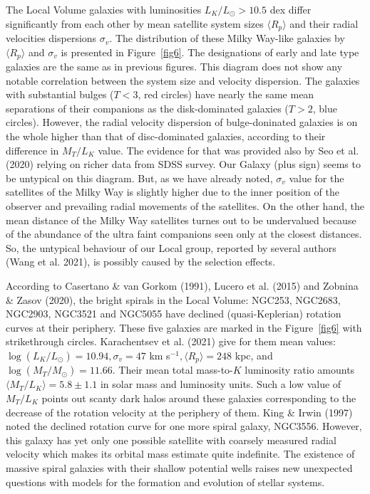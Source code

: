 \documentclass[proof]{WileyASNA-v1}
\begin{document}
The Local Volume galaxies with luminosities $L_K/L_{\odot}>10.5$ dex differ
significantly from each other by mean satellite system sizes $\langle R_p
\rangle$ and their radial velocities dispersions $\sigma_v$. The distribution of
these Milky Way-like galaxies by $\langle R_p\rangle$ and $\sigma_v$ is
presented in Figure~\ref{fig6}. The designations of early and late type galaxies
are the same as in previous figures. This diagram does not show any notable
correlation between the system size and velocity dispersion. The galaxies with
substantial bulges ($T<3$, red circles) have nearly the same mean separations of
their companions as the disk-dominated galaxies ($T>2$, blue circles). However,
the radial velocity dispersion of bulge-doninated galaxies is on the whole
higher than that of disc-dominated galaxies, according to their difference in
$M_T/L_K$ value. The evidence for that was provided also by Seo et al. (2020)
relying on richer data from  SDSS survey. Our Galaxy (plus sign) seems to be
untypical on this diagram. But, as we have already noted, $\sigma_v$ value for
the satellites of the Milky Way is slightly higher due to the inner position of
the observer and prevailing radial movements of the satellites. On the other
hand, the mean distance of the Milky Way satellites turnes out to be undervalued
because of the abundance of the ultra faint companions seen only at the closest
distances. So, the untypical behaviour of our Local group, reported by several
authors (Wang et al. 2021), is possibly caused by the selection effects.

According to Casertano \& van Gorkom (1991), Lucero et al. (2015) and Zobnina \&
Zasov (2020), the bright spirals in the Local Volume: NGC253, NGC2683, NGC2903,
NGC3521 and NGC5055 have declined (quasi-Keplerian) rotation curves at their
periphery. These five galaxies are marked in the Figure~\ref{fig6} with
strikethrough circles. Karachentsev et al. (2021) give for them mean values:
$\log(L_K/L_{\odot})=10.94, \sigma_v= 47$ km s$^{-1}, \langle R_p\rangle=248$
kpc, and $\log(M_T/M_{\odot})=11.66$. Their mean total mass-to-$K$ luminosity
ratio amounts $\langle M_T/L_K\rangle = 5.8\pm1.1$ in solar mass and luminosity
units. Such a low value of $M_T/L_K$ points out scanty dark halos around these
galaxies corresponding to the decrease of the rotation velocity at the periphery
of them. King \& Irwin (1997) noted  the declined rotation curve for one more
spiral galaxy, NGC3556. However, this galaxy has yet only one possible satellite
with coarsely measured radial velocity which makes its orbital mass estimate
quite indefinite. The existence of massive spiral galaxies with their
shallow	potential wells raises new unexpected questions with models for the
formation and evolution of stellar systems.
\end{document}
